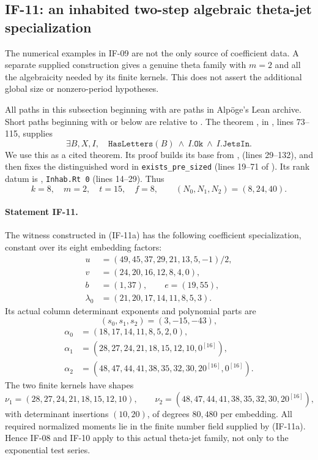 \documentclass[11pt,a4paper]{article}
\theoremstyle{definition}
\theoremstyle{remark}
\begin{document}
\subsection{IF-11: an inhabited two-step algebraic theta-jet specialization}
The numerical examples in IF-09 are not the only source of coefficient
data. A separate supplied construction gives a genuine theta family
with $m=2$ and all the algebraicity needed by its finite kernels. This
does not assert the additional global size or nonzero-period hypotheses.

All paths in this subsection beginning with  are
paths in Alp\"oge's Lean archive. Short paths beginning with 
or  below are relative to
. The theorem
, in
, lines 73--115, supplies
\[
 \exists B,X,I,\quad
 \texttt{HasLetters}(B)\ \wedge\ I.\texttt{Ok}\ \wedge\ I.\texttt{JetsIn}.
                                                               \tag{IF-11a}
\]
We use this as a cited theorem. Its proof builds its base from
, 
(lines 29--132), and then fixes the distinguished word in
\texttt{exists\_pre\_sized} (lines 19--71 of
). Its rank datum is
,
\texttt{Inhab.Rt 0} (lines 14--29). Thus
\[
 k=8,\quad m=2,\quad t=15,\quad f=8,\qquad
 (N_0,N_1,N_2)=(8,24,40).
\]

\paragraph{Statement IF-11.}
The witness constructed in (IF-11a) has the following coefficient
specialization, constant over its eight embedding factors:
\[
\begin{split}
 u&=(49,45,37,29,21,13,5,-1)/2,\\
 v&=(24,20,16,12,8,4,0),\\
 b&=(1,37),\qquad e=(19,55),\\
 \lambda_0&=(21,20,17,14,11,8,5,3).
\end{split}                                                     \tag{IF-11b}
\]
Its actual column determinant exponents and polynomial parts are
\[
 (s_0,s_1,s_2)=(3,-15,-43),
\]
\[
\begin{split}
 \alpha_0&=(18,17,14,11,8,5,2,0),\\
 \alpha_1&=(28,27,24,21,18,15,12,10,0^{[16]}),\\
 \alpha_2&=(48,47,44,41,38,35,32,30,20^{[16]},0^{[16]}).
\end{split}                                                     \tag{IF-11c}
\]
The two finite kernels have shapes
\[
 \nu_1=(28,27,24,21,18,15,12,10),\qquad
 \nu_2=(48,47,44,41,38,35,32,30,20^{[16]}),          \tag{IF-11d}
\]
with determinant insertions $(10,20)$, of degrees $80,480$ per
embedding. All required normalized moments lie in the finite number
field supplied by (IF-11a). Hence IF-08 and IF-10 apply to this actual
theta-jet family, not only to the exponential test series.
\end{document}
